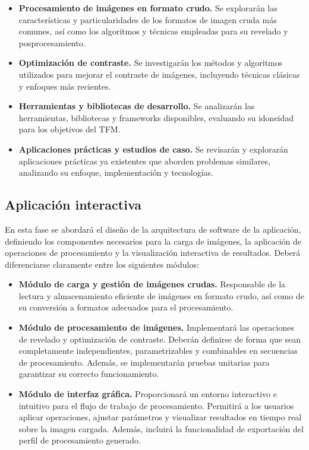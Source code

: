 \begin{itemize}[noitemsep]
    \item \textbf{Procesamiento de imágenes en formato crudo.} Se explorarán 
    las características y particularidades de los formatos de imagen cruda más comunes,
    así como los algoritmos y técnicas empleadas para su revelado y posprocesamiento.
    \item \textbf{Optimización de contraste.} Se investigarán los métodos y algoritmos
    utilizados para mejorar el contraste de imágenes, incluyendo técnicas clásicas y
    enfoques más recientes.
    \item \textbf{Herramientas y bibliotecas de desarrollo.} Se analizarán las
    herramientas, bibliotecas y frameworks disponibles, evaluando su idoneidad para los objetivos del TFM.
    \item \textbf{Aplicaciones prácticas y estudios de caso.} Se revisarán y explorarán 
    aplicaciones prácticas ya existentes que aborden problemas similares, analizando 
    su enfoque, implementación y tecnologías.
\end{itemize}

\newpage

\subsection{Aplicación interactiva} \label{subsec:2_2_aplicacion_interactiva}
En esta fase se abordará el diseño de la arquitectura de software de la aplicación, definiendo los 
componentes necesarios para la carga de imágenes, la aplicación de operaciones de procesamiento y 
la visualización interactiva de resultados. Deberá diferenciarse claramente entre los siguientes módulos:

\begin{itemize}[noitemsep]
    \item \textbf{Módulo de carga y gestión de imágenes crudas.} Responsable de la lectura
    y almacenamiento eficiente de imágenes en formato crudo, así como de su conversión a 
    formatos adecuados para el procesamiento.
    \item \textbf{Módulo de procesamiento de imágenes.} Implementará las operaciones
    de revelado y optimización de contraste. Deberán definirse de forma que sean
    completamente independientes, parametrizables y combinables en secuencias de 
    procesamiento. Además, se implementarán pruebas unitarias para garantizar su 
    correcto funcionamiento.
    \item \textbf{Módulo de interfaz gráfica.} Proporcionará un entorno interactivo 
    e intuitivo para el flujo de trabajo de procesamiento. Permitirá a los usuarios 
    aplicar operaciones, ajustar parámetros y visualizar resultados en tiempo real 
    sobre la imagen cargada. Además, incluirá la funcionalidad de exportación del 
    perfil de procesamiento generado.
\end{itemize}

